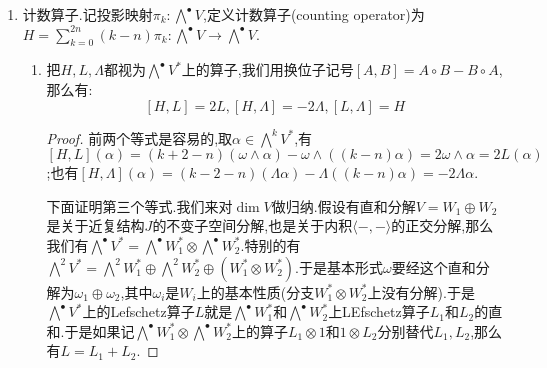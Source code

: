 \begin{enumerate}
\begin{enumerate}[(1)]
\begin{proof}
        	这件事是因为我们解释过$V_{\mathbb{C}}=V^{1,0}\oplus V^{0,1}$是关于$\langle-,-\rangle_{\mathbb{C}}$的正交分解.
        \end{proof}
        \item 记$\dim_{\mathbb{R}}V=2n$,那么Hodge$\star$映射把$\bigwedge^{p,q}V^*$映入$\bigwedge^{n-q,n-p}V^*$.
        \begin{proof}
        	
        	任取$\beta\in\wedge^{p,q}(V)$,$p+q=k$,取$\alpha\in\wedge_{\mathbb{C}}^{2n-k}(V)$,按照定义有:$$\langle\alpha,\star\beta\rangle_{\mathbb{C}}=\langle\alpha,\overline{\star\beta}\rangle=\frac{\alpha\wedge\star\overline{\star\beta}}{\Omega}=\frac{\alpha\wedge\star\star\overline{\beta}}{\Omega}=\pm\frac{\alpha\wedge\overline{\beta}}{\Omega}$$
        	
        	如果$\alpha\in\wedge^{p',q'}(V)$,其中$p'+q'=0$,那么这里只要$p'\not=n-q$和$q'\not=n-p$,就得到$\langle\alpha,\star\beta\rangle_{\mathbb{C}}=0$.换句话讲如果$(p',q')\not=(n-q,n-p)$,就有$\star\beta\perp\wedge^{p',q'}(V)$.也即必须有$\star\beta\in\wedge^{n-q,n-p}(V)$.
        \end{proof}
    \end{enumerate}
    \item 计数算子.记投影映射$\pi_k:\bigwedge^{\bullet}V$,定义计数算子(counting operator)为$H=\sum_{k=0}^{2n}(k-n)\pi_k:\bigwedge^{\bullet}V\to\bigwedge^{\bullet}V$.
    \begin{enumerate}[(1)]
    	\item 把$H,L,\Lambda$都视为$\bigwedge^{\bullet}V^*$上的算子,我们用换位子记号$[A,B]=A\circ B-B\circ A$,那么有:
    	$$[H,L]=2L,[H,\Lambda]=-2\Lambda,[L,\Lambda]=H$$
    	\begin{proof}
    		
    		前两个等式是容易的,取$\alpha\in\bigwedge^kV^*$,有$[H,L](\alpha)=(k+2-n)(\omega\wedge\alpha)-\omega\wedge((k-n)\alpha)=2\omega\wedge\alpha=2L(\alpha)$;也有$[H,\Lambda](\alpha)=(k-2-n)(\Lambda\alpha)-\Lambda((k-n)\alpha)=-2\Lambda\alpha$.
    		
    		\qquad
    		
    		下面证明第三个等式.我们来对$\dim V$做归纳.假设有直和分解$V=W_1\oplus W_2$是关于近复结构$J$的不变子空间分解,也是关于内积$\langle-,-\rangle$的正交分解,那么我们有$\bigwedge^{\bullet}V^*=\bigwedge^{\bullet}W_1^*\otimes\bigwedge^{\bullet}W_2^*$.特别的有$\bigwedge^2V^*=\bigwedge^2W_1^*\oplus\bigwedge^2W_2^*\oplus\left(W_1^*\otimes W_2^*\right)$.于是基本形式$\omega$要经这个直和分解为$\omega_1\oplus\omega_2$,其中$\omega_i$是$W_i$上的基本性质(分支$W_1^*\otimes W_2^*$上没有分解).于是$\bigwedge^{\bullet}V^*$上的Lefschetz算子$L$就是$\bigwedge^{\bullet}W_1^*$和$\bigwedge^{\bullet}W_2^*$上LEfschetz算子$L_1$和$L_2$的直和.于是如果记$\bigwedge^{\bullet}W_1^*\otimes\bigwedge^{\bullet}W_2^*$上的算子$L_1\otimes1$和$1\otimes L_2$分别替代$L_1,L_2$,那么有$L=L_1+L_2$.
    		

\end{proof}
\end{enumerate}
\end{enumerate}
